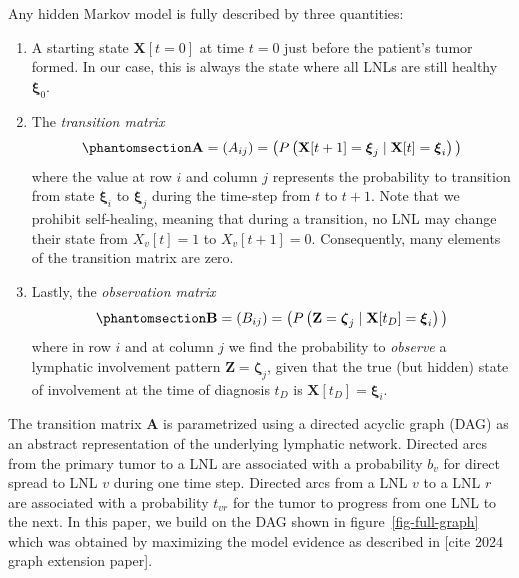 \documentclass[
  sn-mathphys-num,
]{sn-jnl}
\providecommand{\tightlist}{%
  \setlength{\itemsep}{0pt}\setlength{\parskip}{0pt}}\usepackage{longtable,booktabs,array}
\begin{document}
Any hidden Markov model is fully described by three quantities:

\begin{enumerate}
\def\labelenumi{\arabic{enumi}.}
\tightlist
\item
  A starting state \(\mathbf{X}[t=0]\) at time \(t=0\) just before the
  patient's tumor formed. In our case, this is always the state where
  all LNLs are still healthy \(\boldsymbol{\xi}_0\).
\item
  The \emph{transition matrix}
  \begin{equation}\phantomsection\label{eq-trans-matrix}{
  \mathbf{A} = \left( A_{ij} \right) = \big( P \left( \mathbf{X}[t+1] = \boldsymbol{\xi}_j \mid \mathbf{X}[t] = \boldsymbol{\xi}_i \right) \big)
  }\end{equation} where the value at row \(i\) and column \(j\)
  represents the probability to transition from state
  \(\boldsymbol{\xi}_i\) to \(\boldsymbol{\xi}_j\) during the time-step
  from \(t\) to \(t+1\). Note that we prohibit self-healing, meaning
  that during a transition, no LNL may change their state from
  \(X_v[t]=1\) to \(X_v[t+1]=0\). Consequently, many elements of the
  transition matrix are zero.
\item
  Lastly, the \emph{observation matrix}
  \begin{equation}\phantomsection\label{eq-obs-matrix}{
  \mathbf{B} = \left( B_{ij} \right) = \big( P \left( \mathbf{Z} = \boldsymbol{\zeta}_j \mid \mathbf{X}[t_D] = \boldsymbol{\xi}_i \right) \big)
  }\end{equation} where in row \(i\) and at column \(j\) we find the
  probability to \emph{observe} a lymphatic involvement pattern
  \(\mathbf{Z} = \boldsymbol{\zeta}_j\), given that the true (but
  hidden) state of involvement at the time of diagnosis \(t_D\) is
  \(\mathbf{X}[t_D] = \boldsymbol{\xi}_i\).
\end{enumerate}

The transition matrix \(\mathbf{A}\) is parametrized using a directed
acyclic graph (DAG) as an abstract representation of the underlying
lymphatic network. Directed arcs from the primary tumor to a LNL are
associated with a probability \(b_v\) for direct spread to LNL \(v\)
during one time step. Directed arcs from a LNL \(v\) to a LNL \(r\) are
associated with a probability \(t_{vr}\) for the tumor to progress from
one LNL to the next. In this paper, we build on the DAG shown in
figure~\ref{fig-full-graph} which was obtained by maximizing the model
evidence as described in {[}cite 2024 graph extension paper{]}.
\end{document}
